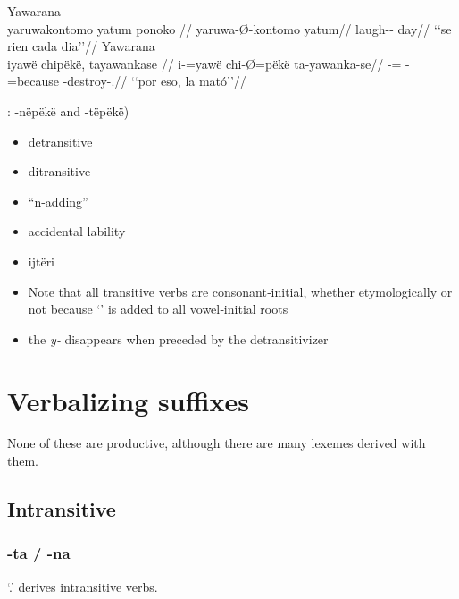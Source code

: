\documentclass{memoir}
\begin{document}
\pex\label{}    \a Yawarana\\
    \label{convrisamaj-42}        \begingl
        \glpreamble yaruwakontomo yatum ponoko //
        \gla yaruwa-Ø-kontomo yatum//
        \glb laugh-- day//
            \glft ‘‘se rien cada dia’’//  
        \endgl 
    \a Yawarana\\
    \label{convfemgrme-217}        \begingl
        \glpreamble iyawë chipëkë, tayawankase //
        \gla i-=yawë chi-Ø=pëkë ta-yawanka-se//
        \glb {}-= -=because -destroy-.//
            \glft ‘‘por eso, la mató’’//  
        \endgl 
\xe

: -nëpëkë and -tëpëkë)

\begin{itemize}
\item
  detransitive
\item
  ditransitive
\item
  ``n-adding''
\item
  accidental lability
\item
  ijtëri
\item
  Note that all transitive verbs are consonant‑initial, whether
  etymologically or not because  `' is added to all
  vowel‑initial roots
\item
  the \emph{y‑} disappears when preceded by the detransitivizer
\end{itemize}

\section{\texorpdfstring{Verbalizing suffixes
\label{sec:vbz}}{Verbalizing suffixes }}

None of these are productive, although there are many lexemes derived
with them.

\subsection{Intransitive}

\subsubsection{-ta / -na}

 `.' derives intransitive verbs.
\end{document}
